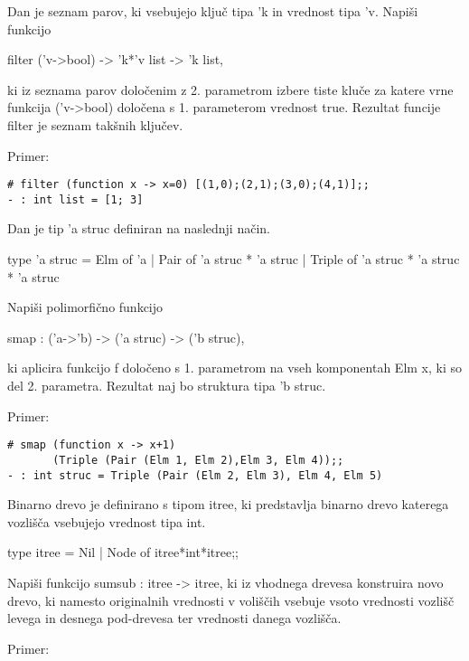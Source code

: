\begin{ex}
Dan je seznam parov, ki vsebujejo klju\v c tipa 'k in vrednost tipa 'v. Napi\v si funkcijo 

filter ('v->bool) -> 'k*'v list -> 'k list, 

ki iz seznama parov dolo\v cenim z 2. parametrom izbere tiste klu\v ce za katere vrne funkcija ('v->bool) dolo\v cena s 1. parameterom vrednost true. Rezultat funcije filter je seznam tak\v snih klju\v cev. 

Primer:

\begin{verbatim}
# filter (function x -> x=0) [(1,0);(2,1);(3,0);(4,1)];; 
- : int list = [1; 3] 

\end{verbatim}

\end{ex} \begin{ex}
Dan je tip 'a struc definiran na naslednji na\v cin. 

type 'a struc = 
    Elm of 'a 
  | Pair of 'a struc * 'a struc 
  | Triple of 'a struc * 'a struc * 'a struc


Napi\v si polimorfi\v cno funkcijo 

smap : ('a->'b) -> ('a struc) -> ('b struc), 

ki aplicira funkcijo f dolo\v ceno s 1. parametrom na vseh komponentah Elm x, ki so del 2. parametra. Rezultat naj bo struktura tipa 'b struc.

Primer:            

\begin{verbatim}
# smap (function x -> x+1) 
       (Triple (Pair (Elm 1, Elm 2),Elm 3, Elm 4));; 
- : int struc = Triple (Pair (Elm 2, Elm 3), Elm 4, Elm 5) 

\end{verbatim}

\end{ex} \begin{ex}
Binarno drevo je definirano s tipom itree, ki predstavlja binarno drevo katerega vozli\v s\v ca vsebujejo vrednost tipa int. 

type itree = Nil | Node of itree*int*itree;;

Napi\v si funkcijo sumsub : itree -> itree, ki iz vhodnega drevesa konstruira novo drevo, ki namesto originalnih vrednosti v voli\v s\v cih vsebuje vsoto vrednosti vozli\v s\v c levega in desnega pod-drevesa ter vrednosti danega vozli\v s\v ca. 

Primer:


\end{ex}

